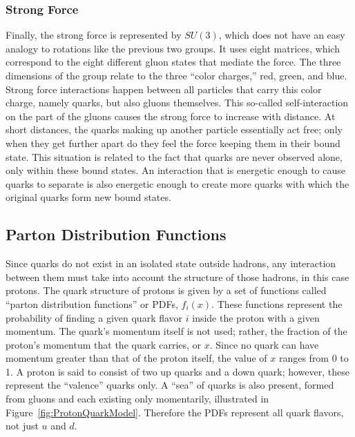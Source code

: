 \subsubsection{Strong Force}
\label{theory:strong}
Finally, the strong force is represented by $SU(3)$, 
which does not have an easy analogy to rotations 
like the previous two groups.  
It uses eight matrices, which correspond to the 
eight different gluon states that mediate the force.  
The three dimensions of the group relate to the 
three ``color charges,'' red, green, and blue.  
Strong force interactions happen between all particles 
that carry this color charge, 
namely quarks, but also gluons themselves.  
This so-called self-interaction on the part of the gluons 
causes the strong force to increase with distance.  
At short distances, the quarks making up another particle 
essentially act free; 
only when they get further apart do they feel the force 
keeping them in their bound state.  
This situation is related to the fact that quarks are 
never observed alone, only within these bound states.  
An interaction that is energetic enough to cause 
quarks to separate is also energetic enough to 
create more quarks with which the original quarks 
form new bound states.  


\subsection{Parton Distribution Functions}
\label{theory:pdf}

Since quarks do not exist in an isolated state 
outside hadrons, 
any interaction between them must 
take 
into account the structure of those hadrons, 
in this case protons.  
The quark structure of protons is given 
by a set of functions called 
``parton distribution functions'' or PDFs, 
$f_i(x)$. 
These functions represent the probability 
of finding a given quark flavor $i$ inside 
the proton with a given momentum.  
The quark's momentum itself is not used; 
rather, the fraction of the proton's 
momentum that the quark carries, or $x$. 
Since no quark can have momentum greater 
than that of the proton itself, 
the value of $x$ ranges from 0 to 1.  
A proton is said to consist of two up quarks 
and a down quark; 
however, these represent the ``valence'' quarks only.  
A ``sea'' of quarks is also present, 
formed from gluons and each existing only 
momentarily, 
illustrated in Figure~\ref{fig:ProtonQuarkModel}.  
Therefore the PDFs represent all quark 
flavors, not just $u$ and $d$.  


